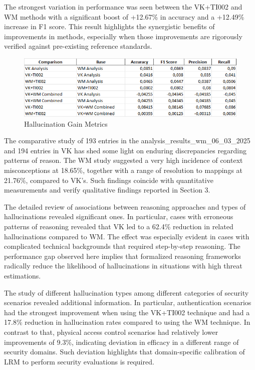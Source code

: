 \documentclass[sigconf]{acmart}
\begin{document}
The strongest variation in performance was seen between the VK+TI002 and WM methods with a significant boost of +12.67\% in accuracy and a +12.49\% increase in F1 score. This result highlights the synergistic benefits of improvements in methods, especially when those improvements are rigorously verified against pre-existing reference standards.

\begin{figure}
    \centering
    \includegraphics[width=0.5\linewidth]{hallucination_gain.png}
    \caption{Hallucination Gain Metrics}
    \label{fig:enter-label}
\end{figure}

The comparative study of 193 entries in the analysis\_results\_wm\_06\_03\_2025 and 194 entries in VK has shed some light on enduring discrepancies regarding patterns of reason. The WM study suggested a very high incidence of context misconceptions at 18.65\%, together with a range of resolution to mappings at 21.76\%, compared to VK's. Such findings coincide with quantitative measurements and verify qualitative findings reported in Section 3.

The detailed review of associations between reasoning approaches and types of hallucinations revealed significant ones. In particular, cases with erroneous patterns of reasoning revealed that VK led to a 62.4\% reduction in related hallucinations compared to WM. The effect was especially evident in cases with complicated technical backgrounds that required step-by-step reasoning. The performance gap observed here implies that formalized reasoning frameworks radically reduce the likelihood of hallucinations in situations with high threat estimations.

The study of different hallucination types among different categories of security scenarios revealed additional information. In particular, authentication scenarios had the strongest improvement when using the VK+TI002 technique and had a 17.8\% reduction in hallucination rates compared to using the WM technique. In contrast to that, physical access control scenarios had relatively lower improvements of 9.3\%, indicating deviation in efficacy in a different range of security domains. Such deviation highlights that domain-specific calibration of LRM to perform security evaluations is required.
\end{document}
